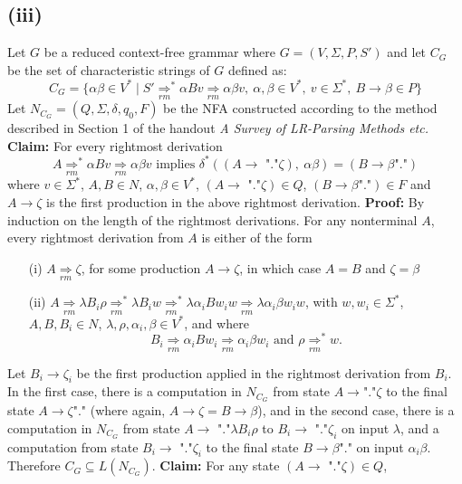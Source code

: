 \documentclass[12pt]{article}
\begin{document}
\subsection*{(iii)} Let $G$ be a reduced context-free grammar where
$G = (V,\Sigma,P,S')$ and let $C_G$ be the set of characteristic strings of $G$
defined as:
$$C_G = \{\alpha\beta \in V^* \mid S' \underset{rm}{\Longrightarrow}^* \alpha Bv
\underset{rm}{\Longrightarrow} \alpha\beta v,\ \alpha,\beta \in V^*,\ v\in
\Sigma^*,\ B \rightarrow \beta \in P \}$$
Let $N_{C_G} = (Q,\Sigma,\delta,q_0,F)$ be the NFA constructed according to the
method described in Section 1 of the handout
\textit{A Survey of LR-Parsing Methods etc.}
\medskip\newline
\textbf{Claim: } For every rightmost derivation
$$A \underset{rm}{\Longrightarrow}^* \alpha Bv \underset{rm}{\Longrightarrow}
\alpha\beta v \text{ implies } \delta^*((A \rightarrow \text{ "."}\zeta)
,\ \alpha\beta) = (B \rightarrow \beta\text{"."})$$
where $v \in \Sigma^*$, $A,B\in N$, $\alpha,\beta\in V^*$,
$(A \rightarrow \text{ "."}\zeta)\in Q$, $(B \rightarrow \beta\text{"."})\in F$
and $A \rightarrow \zeta$ is the first production in the above rightmost
derivation.
\medskip\newline
\textbf{Proof: } By induction on the length of the rightmost derivations.
\medskip\newline
For any nonterminal $A$, every rightmost derivation from $A$ is either of the form
\begin{enumerate}
\item[(i)]
$A \underset{rm}{\Longrightarrow} \zeta$,  for some  production
$A \rightarrow  \zeta$, in which case $A = B$ and $\zeta = \beta$
\item[(ii)]
$A \underset{rm}{\Longrightarrow} \lambda B_{i}\rho
\underset{rm}{\Longrightarrow}^* \lambda B_{i}w
\underset{rm}{\Longrightarrow}^* \lambda \alpha _{i}Bw_{i}w
\underset{rm}{\Longrightarrow} \lambda \alpha _{i}\beta w_{i}w$,
with $w,w_i \in \Sigma^*$, $A,B,B_i \in  N$,
$\lambda, \rho, \alpha_i, \beta\in  V^*$, and where
$$B_i \underset{rm}{\Longrightarrow} \alpha_i Bw_i
\underset{rm}{\Longrightarrow} \alpha_i \beta w_i \text{ and }
\rho \underset{rm}{\Longrightarrow}^* w.$$
\end{enumerate}

\noindent Let $B_i \rightarrow \zeta_i$ be the first production applied
in the rightmost derivation from $B_i$.
In the first case, there is a computation in $N_{C_G}$ from
state $A \rightarrow  \text{"."}\zeta$
to the final state $A \rightarrow \zeta \text{"."}$
(where again, $A \rightarrow \zeta = B \rightarrow \beta$),
and in the second case, there is a computation in $N_{C_G}$ from state
$A \rightarrow \text{ "."}\lambda B_i \rho$
to $B_i \rightarrow \text{ "."}\zeta_i$
on input $\lambda$, and a computation from
state $B_i \rightarrow \text{ "."}\zeta_i$ to
the final state $B \rightarrow \beta\text{"."}$
on input $\alpha_i \beta$.
\medskip\newline
Therefore $C_G \subseteq L(N_{C_G})$.
\medskip\newline
\textbf{Claim: } For any state $(A \rightarrow \text{ "."}\zeta) \in Q$,
\end{document}
